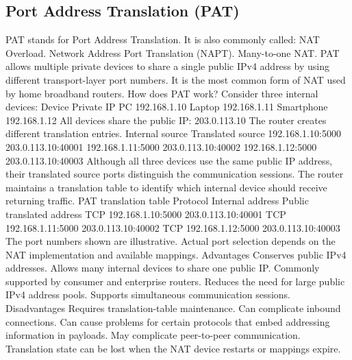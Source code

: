 \subsection{Port Address Translation (PAT)}
PAT stands for Port Address Translation.
It is also commonly called:
NAT Overload.
Network Address Port Translation (NAPT).
Many-to-one NAT.
PAT allows multiple private devices to share a single public IPv4 address by using different transport-layer port numbers.
It is the most common form of NAT used by home broadband routers.
How does PAT work?
Consider three internal devices:
Device
Private IP
PC
192.168.1.10
Laptop
192.168.1.11
Smartphone
192.168.1.12
All devices share the public IP:
203.0.113.10
The router creates different translation entries.
Internal source
Translated source
192.168.1.10:5000
203.0.113.10:40001
192.168.1.11:5000
203.0.113.10:40002
192.168.1.12:5000
203.0.113.10:40003
Although all three devices use the same public IP address, their translated source ports distinguish the communication sessions.
The router maintains a translation table to identify which internal device should receive returning traffic.
PAT translation table
Protocol
Internal address
Public translated address
TCP
192.168.1.10:5000
203.0.113.10:40001
TCP
192.168.1.11:5000
203.0.113.10:40002
TCP
192.168.1.12:5000
203.0.113.10:40003
The port numbers shown are illustrative. Actual port selection depends on the NAT implementation and available mappings.
Advantages
Conserves public IPv4 addresses.
Allows many internal devices to share one public IP.
Commonly supported by consumer and enterprise routers.
Reduces the need for large public IPv4 address pools.
Supports simultaneous communication sessions.
Disadvantages
Requires translation-table maintenance.
Can complicate inbound connections.
Can cause problems for certain protocols that embed addressing information in payloads.
May complicate peer-to-peer communication.
Translation state can be lost when the NAT device restarts or mappings expire.
